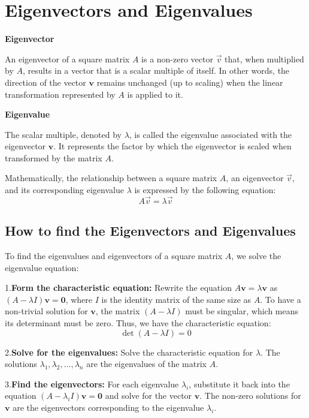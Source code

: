 \section{Eigenvectors and Eigenvalues}

\textbf{Eigenvector}

An eigenvector of a square matrix \(A\) is a non-zero vector \(\vec{v}\) that, when multiplied by \(A\), results in a vector that is a scalar multiple of itself. In other words, the direction of the vector \(\mathbf{v}\) remains unchanged (up to scaling) when the linear transformation represented by \(A\) is applied to it.

\textbf{Eigenvalue}

The scalar multiple, denoted by \(\lambda\), is called the eigenvalue associated with the eigenvector \(\mathbf{v}\). It represents the factor by which the eigenvector is scaled when transformed by the matrix \(A\).

Mathematically, the relationship between a square matrix \(A\), an eigenvector \(\vec{v}\), and its corresponding eigenvalue \(\lambda\) is expressed by the following equation:
\[
A\vec{v} = \lambda\vec{v}
\]

\subsection{How to find the Eigenvectors and Eigenvalues}

To find the eigenvalues and eigenvectors of a square matrix \(A\), we solve the eigenvalue equation:

 1.\textbf{Form the characteristic equation:}
    Rewrite the equation \(A\mathbf{v} = \lambda\mathbf{v}\) as \((A - \lambda I)\mathbf{v} = \mathbf{0}\), where \(I\) is the identity matrix of the same size as \(A\). To have a non-trivial solution for \(\mathbf{v}\), the matrix \((A - \lambda I)\) must be singular, which means its determinant must be zero. Thus, we have the characteristic equation:
    \[
    \det(A - \lambda I) = 0
    \]

 2.\textbf{Solve for the eigenvalues:}
    Solve the characteristic equation for \(\lambda\). The solutions \(\lambda_1, \lambda_2, \dots, \lambda_n\) are the eigenvalues of the matrix \(A\).

 3.\textbf{Find the eigenvectors:}
    For each eigenvalue \(\lambda_i\), substitute it back into the equation \((A - \lambda_i I)\mathbf{v} = \mathbf{0}\) and solve for the vector \(\mathbf{v}\). The non-zero solutions for \(\mathbf{v}\) are the eigenvectors corresponding to the eigenvalue \(\lambda_i\).

